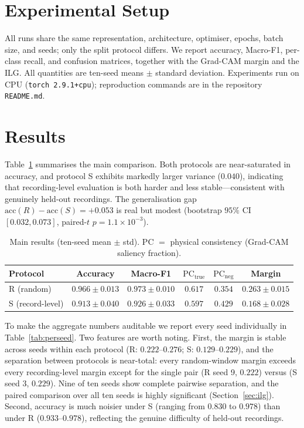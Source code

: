 \documentclass[11pt]{article}
\begin{document}
\section{Experimental Setup}
All runs share the same representation, architecture, optimiser, epochs, batch size, and
seeds; only the split protocol differs. We report accuracy, Macro-F1, per-class recall,
and confusion matrices, together with the Grad-CAM margin and the ILG. All quantities are
ten-seed means $\pm$ standard deviation. Experiments run on CPU (\texttt{torch
2.9.1+cpu}); reproduction commands are in the repository \texttt{README.md}.

\section{Results}
Table~\ref{tab:main} summarises the main comparison. Both protocols are near-saturated in
accuracy, and protocol S exhibits markedly larger variance ($0.040$), indicating that
recording-level evaluation is both harder and less stable---consistent with genuinely
held-out recordings. The generalisation gap $\text{acc}(R)-\text{acc}(S)=+0.053$ is real
but modest (bootstrap $95\%$ CI $[0.032, 0.073]$, paired-$t$ $p=1.1\times10^{-3}$).

\begin{table}[H]
\centering
\caption{Main results (ten-seed mean $\pm$ std). PC $=$ physical consistency
(Grad-CAM saliency fraction).}
\label{tab:main}
\begin{tabular}{lccccc}
\toprule
Protocol & Accuracy & Macro-F1 & $\mathrm{PC_{true}}$ & $\mathrm{PC_{neg}}$ & Margin \\
\midrule
R (random)      & $0.966\pm0.013$ & $0.973\pm0.010$ & $0.617$ & $0.354$ & $0.263\pm0.015$ \\
S (record-level)& $0.913\pm0.040$ & $0.926\pm0.033$ & $0.597$ & $0.429$ & $0.168\pm0.028$ \\
\bottomrule
\end{tabular}
\end{table}

To make the aggregate numbers auditable we report every seed individually in
Table~\ref{tab:perseed}. Two features are worth noting. First, the margin is stable across
seeds within each protocol (R: $0.222$--$0.276$; S: $0.129$--$0.229$), and the separation
between protocols is near-total: every random-window margin exceeds every recording-level
margin except for the single pair (R seed 9, $0.222$) versus (S seed 3, $0.229$). Nine of
ten seeds show complete pairwise separation, and the paired comparison over all ten seeds
is highly significant (Section~\ref{sec:ilg}). Second, accuracy is much noisier under S
(ranging from $0.830$ to $0.978$) than under R ($0.933$--$0.978$), reflecting the genuine
difficulty of held-out recordings.
\end{document}
